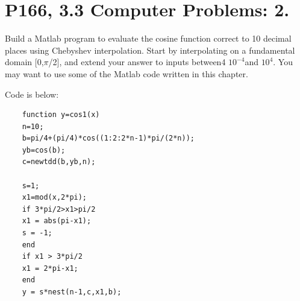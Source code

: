 \documentclass[UTF8]{ctexart}
\begin{document}
\section{P166, 3.3 Computer Problems: 2.}
Build a Matlab program to evaluate the cosine function correct to 10 decimal places using
Chebyshev interpolation. Start by interpolating on a fundamental domain [0,$\pi$/2], and extend
your answer to inputs between4 $10^{-4} $and $10^4$. You may want to use some of the Matlab code written in this chapter.

Code is below:
   \begin{centering}
	\begin{lstlisting}		
	function y=cos1(x)
	n=10;
	b=pi/4+(pi/4)*cos((1:2:2*n-1)*pi/(2*n));
	yb=cos(b);                     
	c=newtdd(b,yb,n);
	
	s=1;                           
	x1=mod(x,2*pi);
	if 3*pi/2>x1>pi/2
	x1 = abs(pi-x1);
	s = -1;
	end
	if x1 > 3*pi/2
	x1 = 2*pi-x1;
	end
	y = s*nest(n-1,c,x1,b);	
	\end{lstlisting}   
\end{centering}
\end{document}
